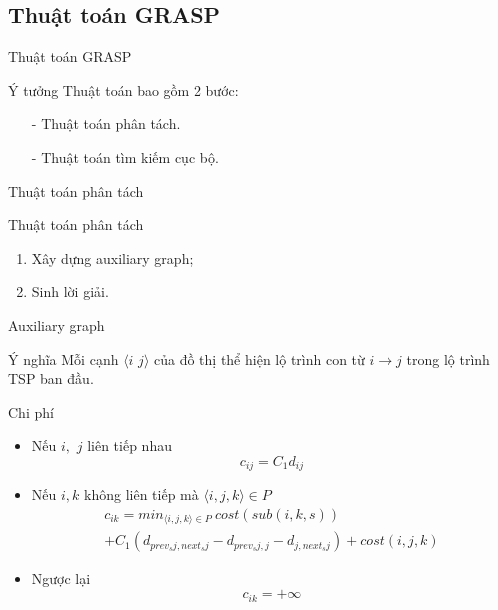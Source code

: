 \documentclass[compress]{beamer}
\begin{document}
\subsection{Thuật toán GRASP}
\begin{frame}{Thuật toán GRASP}
\begin{block}{Ý tưởng}
Thuật toán bao gồm 2 bước: 
\begin{enumerate}
\item[-] Thuật toán phân tách.
\item[-] Thuật toán tìm kiếm cục bộ.
\end{enumerate}
\end{block}
\end{frame}
\begin{frame}{Thuật toán phân tách}
\begin{block}{Thuật toán phân tách}
\begin{enumerate}
\item Xây dựng auxiliary graph;
\item Sinh lời giải.
\end{enumerate}
\end{block}
\end{frame}
\begin{frame}{Auxiliary graph}
\begin{block}{Ý nghĩa}
Mỗi cạnh $\langle i$ $j\rangle$ của đồ thị thể hiện lộ trình con từ $i\rightarrow j$ trong lộ trình TSP ban đầu. 
\end{block}
\begin{block}{Chi phí}
\begin{itemize}
\item Nếu $i,$ $j$ liên tiếp nhau 
$$c_{ij}=C_1d_{ij}$$
\item Nếu $i,k$ không liên tiếp mà  $\langle i,j,k \rangle \in P$
$$\begin{array}{l}
c_{ik}=min_{\langle i,j,k \rangle \in P} \ cost(sub(i,k,s))\\+C_1(d_{prev_sj,next_sj}-d_{prev_sj,j}-d_{j,next_sj})+cost(i,j,k)

\end{array}
$$
\item Ngược lại 
$$c_{ik}=+\infty$$
\end{itemize}
\end{block}
\end{frame}
\end{document}
